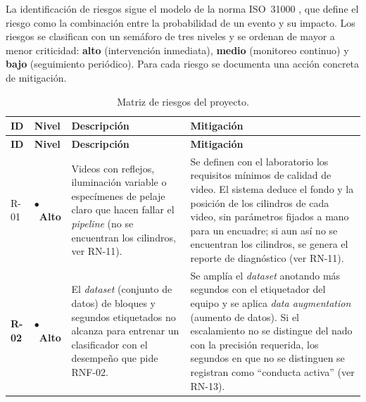 La identificación de riesgos sigue el modelo de la norma ISO~31000 \cite{iso31000}, que
define el riesgo como la combinación entre la probabilidad de un evento y su impacto.
Los riesgos se clasifican con un semáforo de tres niveles y se ordenan de mayor a
menor criticidad: \textcolor{red!70!black}{\textbf{alto}} (intervención inmediata),
\textcolor{orange!80!black}{\textbf{medio}} (monitoreo continuo) y
\textcolor{green!55!black}{\textbf{bajo}} (seguimiento periódico).
Para cada riesgo se documenta una acción concreta de mitigación.

\begin{longtable}{|>{\bfseries}p{0.9cm}|p{2.0cm}|p{4.5cm}|p{5.9cm}|}
\caption{Matriz de riesgos del proyecto.
\label{tab:riesgos}}\\
\hline
\textbf{ID} & \textbf{Nivel} & \textbf{Descripción} & \textbf{Mitigación} \\
\hline
\endfirsthead
\hline
\textbf{ID} & \textbf{Nivel} & \textbf{Descripción} & \textbf{Mitigación} \\
\hline
\endhead
\hline
\endfoot

R-01 & \cellcolor{red!12}\textcolor{red!70!black}{\Large$\bullet$}~\textbf{Alto}
     & Videos con reflejos, iluminación variable o especímenes de pelaje claro que
       hacen fallar el \textit{pipeline} (no se encuentran los cilindros, ver RN-11).
     & Se definen con el laboratorio los requisitos mínimos de calidad de video.
       El sistema deduce el fondo y la posición de los cilindros de cada video, sin
       parámetros fijados a mano para un encuadre; si aun así no se encuentran los
       cilindros, se genera el reporte de diagnóstico (ver RN-11). \\
\hline
R-02 & \cellcolor{red!12}\textcolor{red!70!black}{\Large$\bullet$}~\textbf{Alto}
     & El \textit{dataset} (conjunto de datos) de bloques y segundos etiquetados no alcanza para entrenar un clasificador
       con el desempeño que pide RNF-02.
     & Se amplía el \textit{dataset} anotando más segundos con el etiquetador del equipo y se aplica
       \textit{data augmentation} (aumento de datos). Si el escalamiento no se distingue del nado
       con la precisión requerida, los segundos en que no se distinguen se registran
       como ``conducta activa'' (ver RN-13). \\
\hline


\end{longtable}
